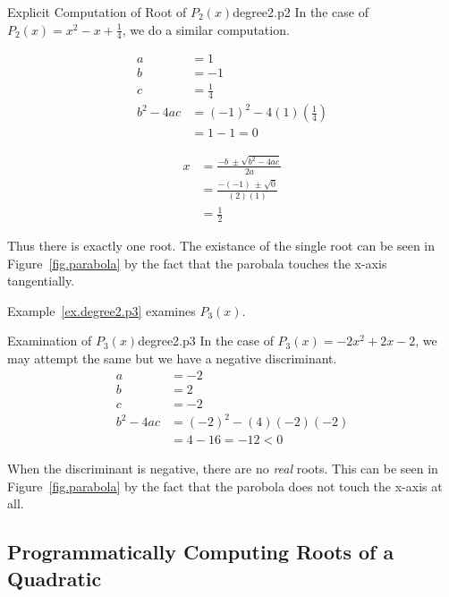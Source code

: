 \begin{example}{Explicit Computation of Root of $P_2(x)$}{degree2.p2}
In the case of $P_2(x) = x^2 -x + \frac{1}{4}$, we do a similar computation.

\begin{align*}
  a &= 1\\
  b &= -1\\
  c &= \frac{1}{4} \\
  b^2 - 4a c &= (-1)^2 - 4 (1) (\frac{1}{4})\\
  &= 1 - 1 = 0
\end{align*}

\begin{align*}
  x &= \frac{-b~ \pm \sqrt{b^2 - 4a c}}{2a}\\
  &= \frac{-(-1)~ \pm \sqrt{0}}{(2)(1)}\\
  &= \frac{1}{2}
\end{align*}


Thus there is exactly one root.  The existance of the single root can be
seen in Figure~\ref{fig.parabola} by the fact that the
parobala touches the x-axis tangentially.
\end{example}

Example~\ref{ex.degree2.p3} examines $P_3(x)$.

\begin{example}{Examination of $P_3(x)$}{degree2.p3}
  In the case of $P_3(x) = -2x^2 + 2x -2$, we may attempt the same but we have a negative discriminant.
  \begin{align*}
    a&=-2\\
    b&=2\\
    c&=-2\\
    b^2 - 4a c  &=(-2)^2 - (4)(-2)(-2)\\
    &= 4 - 16 = -12 < 0
  \end{align*}

When the discriminant
is negative, there are no \emph{real} roots.  This can be seen in
Figure~\ref{fig.parabola} by the fact that the parobola does not
touch the x-axis at all.
\end{example}

\subsection{Programmatically Computing Roots of a Quadratic}

